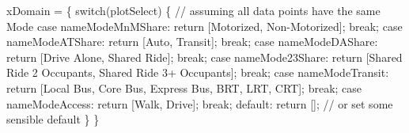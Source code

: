 \documentclass[
  letterpaper,
  DIV=11,
  numbers=noendperiod]{scrreprt}
\newenvironment{Shaded}{\begin{snugshade}}{\end{snugshade}}
\newcommand{\NormalTok}[1]{\textcolor[rgb]{0.00,0.23,0.31}{#1}}
\begin{document}
\begin{Shaded}
\begin{Highlighting}[]
\NormalTok{xDomain = \{}
\NormalTok{    switch(plotSelect) \{  // assuming all data points have the same Mode}
\NormalTok{        case nameModeMnMShare:}
\NormalTok{            return [\textquotesingle{}Motorized\textquotesingle{}, \textquotesingle{}Non{-}Motorized\textquotesingle{}];}
\NormalTok{            break;}
\NormalTok{        case nameModeATShare:}
\NormalTok{            return [\textquotesingle{}Auto\textquotesingle{}, \textquotesingle{}Transit\textquotesingle{}];}
\NormalTok{            break;}
\NormalTok{        case nameModeDAShare:}
\NormalTok{            return [\textquotesingle{}Drive Alone\textquotesingle{}, \textquotesingle{}Shared Ride\textquotesingle{}];}
\NormalTok{            break;}
\NormalTok{        case nameMode23Share:}
\NormalTok{            return [\textquotesingle{}Shared Ride 2 Occupants\textquotesingle{}, \textquotesingle{}Shared Ride 3+ Occupants\textquotesingle{}];}
\NormalTok{            break;}
\NormalTok{        case nameModeTransit:}
\NormalTok{            return [\textquotesingle{}Local Bus\textquotesingle{}, \textquotesingle{}Core Bus\textquotesingle{}, \textquotesingle{}Express Bus\textquotesingle{}, \textquotesingle{}BRT\textquotesingle{}, \textquotesingle{}LRT\textquotesingle{}, \textquotesingle{}CRT\textquotesingle{}];}
\NormalTok{            break;}
\NormalTok{        case nameModeAccess:}
\NormalTok{            return [\textquotesingle{}Walk\textquotesingle{}, \textquotesingle{}Drive\textquotesingle{}];}
\NormalTok{            break;}
\NormalTok{        default:}
\NormalTok{            return [];  // or set some sensible default}
\NormalTok{    \}}
\NormalTok{\}}
\end{Highlighting}
\end{Shaded}
\end{document}
